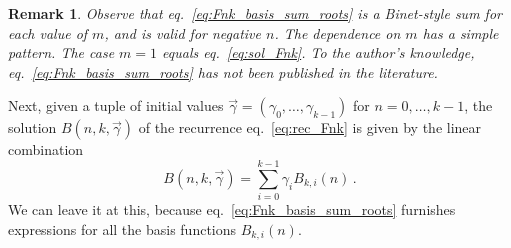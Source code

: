 \documentclass[review]{elsarticle}
\theoremstyle{plain}
\newtheorem{remark}[theorem]{Remark}
\begin{document}
\begin{remark}
Observe that eq.~\eqref{eq:Fnk_basis_sum_roots}
is a Binet-style sum for each value of $m$, and is valid for negative $n$.
The dependence on $m$ has a simple pattern.
The case $m=1$ equals eq.~\eqref{eq:sol_Fnk}.
To the author's knowledge, eq.~\eqref{eq:Fnk_basis_sum_roots} has not been published in the literature.
\end{remark}

Next, given a tuple of initial values $\vec{\gamma}=(\gamma_0,\dots,\gamma_{k-1})$ for $n=0,\dots,k-1$,
the solution $B(n,k,\vec{\gamma})$ of the recurrence eq.~\eqref{eq:rec_Fnk} is given by the linear combination
\begin{equation}
B(n,k,\vec{\gamma}) = \sum_{i=0}^{k-1}\gamma_i B_{k,i}(n) \,.
\end{equation}
We can leave it at this, because eq.~\eqref{eq:Fnk_basis_sum_roots} furnishes expressions for all the basis functions $B_{k,i}(n)$.
\end{document}
